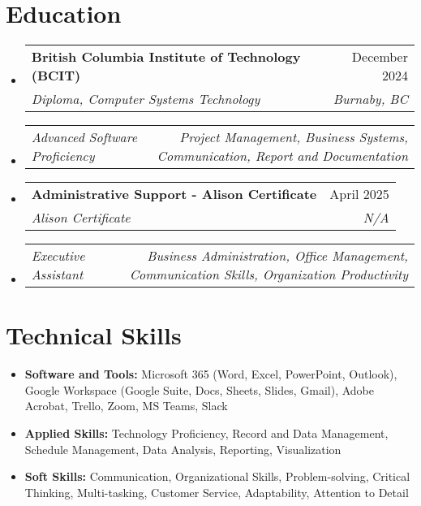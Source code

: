 \documentclass[letterpaper,11pt]{article}
\makeatletter
\newcommand{\resumeItem}[1]{
\item\small{
{#1 \vspace{-2pt}}
}
}
\newcommand{\resumeSubheading}[4]{
\vspace{-2pt}\item
\begin{tabular*}{0.97\textwidth}[t]{l@{\extracolsep{\fill}}r}
\textbf{#1} & #2 \\
\textit{\small#3} & \textit{\small #4} \\
\end{tabular*}\vspace{-7pt}
}
\newcommand{\resumeSubSubheading}[2]{
\item
\begin{tabular*}{0.97\textwidth}{l@{\extracolsep{\fill}}r}
\textit{\small#1} & \textit{\small #2} \\
\end{tabular*}\vspace{-7pt}
}
\newcommand{\resumeSubHeadingListStart}{\begin{itemize}[leftmargin=0.15in, label={}]}
\newcommand{\resumeSubHeadingListEnd}{\end{itemize}}
\makeatother
\begin{document}
\section{Education}
\resumeSubHeadingListStart
\resumeSubheading{British Columbia Institute of Technology (BCIT)}{December 2024}{Diploma, Computer Systems Technology}{Burnaby, BC}
\resumeSubSubheading{Advanced Software Proficiency}{Project Management, Business Systems, Communication, Report and Documentation}
\resumeSubheading{Administrative Support - Alison Certificate}{April 2025}{Alison Certificate}{N/A}
\resumeSubSubheading{Executive Assistant}{Business Administration, Office Management, Communication Skills, Organization Productivity}
\resumeSubHeadingListEnd

\section{Technical Skills}
\resumeSubHeadingListStart
\resumeItem{\textbf{Software and Tools:} Microsoft 365 (Word, Excel, PowerPoint, Outlook), Google Workspace (Google Suite, Docs, Sheets, Slides, Gmail), Adobe Acrobat, Trello, Zoom, MS Teams, Slack}
\resumeItem{\textbf{Applied Skills:} Technology Proficiency, Record and Data Management, Schedule Management, Data Analysis, Reporting, Visualization}
\resumeItem{\textbf{Soft Skills:} Communication, Organizational Skills, Problem-solving, Critical Thinking, Multi-tasking, Customer Service, Adaptability, Attention to Detail}
\resumeSubHeadingListEnd
\end{document}
